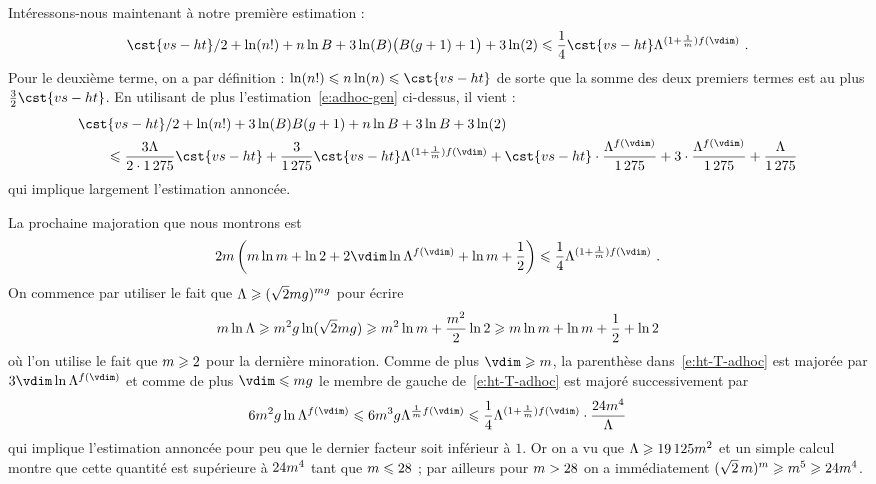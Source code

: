Intéressons-nous maintenant à notre première estimation  :
\begin{equation} \label{e:B-siegel}
  \cst{vs-ht}/2 + \ln(\dimp!) + \dimp \ln B
  + 3 \ln(B) \bigl( B(\genre+1) + 1 \bigr) + 3 \ln(2)
  \le
  \frac14 \cst{vs-ht} \Lambda^{(1 + \frac1\puiss) f(\vdim)}
  \pmm.
\end{equation}
Pour le deuxième terme, on a par définition :
\(
  \ln(\dimp!)
  \le
  \dimp \ln (\dimp)
  \le
  \cst{vs-ht}
\)
de sorte que la somme des deux premiers termes est au plus \( \frac32
  \cst{vs-ht} \).
En utilisant de plus l'estimation~\eqref{e:adhoc-gen} ci-dessus, il vient :
\begin{align}
  & \cst{vs-ht}/2 + \ln(\dimp!)
  + 3 \ln(B) B(\genre+1) + \dimp \ln B + 3\ln B + 3 \ln(2)
  \\ & \qquad \le
  \frac{3\Lambda}{2\cdot1\,275} \cst{vs-ht}
  + \frac3{1\,275} \cst{vs-ht} \Lambda^{(1 + \frac1\puiss) f(\vdim)}
  + \cst{vs-ht} \cdot \frac{ \Lambda^{f(\vdim)} }{ 1\,275 }
  + 3 \cdot \frac{ \Lambda^{f(\vdim)} }{ 1\,275 }
  + \frac{ \Lambda }{ 1\,275 }
\end{align}
qui implique largement l'estimation annoncée.

\medskip

La prochaine majoration  que nous montrons est
\begin{equation} \label{e:ht-T-adhoc}
  2\puiss \left(
    \puiss \ln \puiss + \ln 2 + 2\vdim \ln \Lambda^{f(\vdim)}
    + \ln \puiss + \frac12
  \right)
  \le
  \frac14 \Lambda^{ (1 + \frac1\puiss) f(\vdim) }
  \pmm.
\end{equation}
On commence par utiliser le fait que \( \Lambda \geqslant (\sqrt2
  mg)^{mg} \) pour écrire
\begin{equation}
  m \ln \Lambda
  \geqslant
  m^2 g \ln( \sqrt2 m g )
  \geqslant
  m^2 \ln m + \frac{ m^2 }2 \ln 2
  \geqslant
  m \ln m + \ln m + \frac12 + \ln 2
\end{equation}
où l'on utilise le fait que \( m \geqslant 2 \) pour la dernière minoration.
Comme de plus \( \vdim \ge \puiss \), la parenthèse dans~\eqref{e:ht-T-adhoc}
est majorée par \( 3\vdim \ln \Lambda^{f(\vdim)} \) et comme de plus \( \vdim
  \le \puiss\genre \) le membre de gauche de~\eqref{e:ht-T-adhoc} est majoré
successivement par
\begin{equation}
  6 \puiss^2 \genre \ln \Lambda^{f(\vdim)}
  \le
  6 \puiss^3 \genre \Lambda^{\frac1\puiss f(\vdim)}
  \le
  \frac14 \Lambda^{(1 + \frac1\puiss) f(\vdim)}
  \cdot \frac{ 24 \puiss^4 }{ \Lambda }
\end{equation}
qui implique l'estimation annoncée pour peu que le dernier facteur soit
inférieur à \( 1 \). Or on a vu que \( \Lambda \geqslant 19\,125 m^2 \) et un
simple calcul montre que cette quantité est supérieure à \( 24 m^4 \)
tant que \( m \leqslant 28 \) ; par ailleurs pour \( m > 28 \) on a
immédiatement \( (\sqrt2 \, m)^m \geqslant m^5 \geqslant 24 m^4 \).

